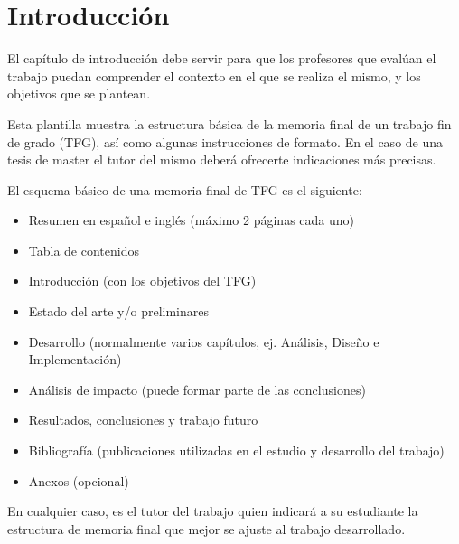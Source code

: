 \chapter{Introducción}
\label{ch:intro}

El capítulo de introducción debe servir para que los profesores que evalúan el trabajo puedan comprender el contexto en el que se realiza el mismo, y los objetivos que se plantean.

Esta plantilla muestra la estructura básica de la memoria final de un trabajo fin de grado (TFG), así como algunas instrucciones de formato. En el caso de una tesis de master el tutor del mismo deberá ofrecerte indicaciones más precisas.

El esquema básico de una memoria final de TFG es el siguiente:
\begin{itemize}
\item Resumen en español e inglés (máximo 2 páginas cada uno)
\item Tabla de contenidos
\item Introducción (con los objetivos del TFG)
\item Estado del arte y/o preliminares
\item Desarrollo (normalmente varios capítulos, ej. Análisis, Diseño e Implementación)
\item Análisis de impacto (puede formar parte de las conclusiones)
\item Resultados, conclusiones y trabajo futuro
\item Bibliografía (publicaciones utilizadas en el estudio y desarrollo del trabajo)
\item Anexos (opcional)
\end{itemize}

En cualquier caso, es el tutor del trabajo quien indicará a su estudiante la estructura de memoria final que mejor se ajuste al trabajo desarrollado.

